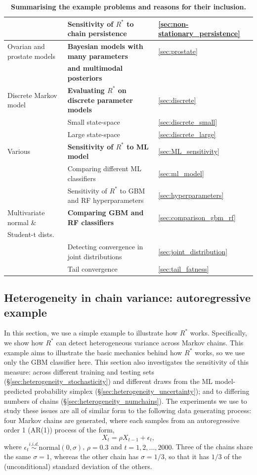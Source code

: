 \documentclass[ba]{imsart}
\numberwithin{equation}{section}
\theoremstyle{plain}
\begin{document}
\begin{table}[]
\begin{tabular}{l|l|l}
		& Sensitivity of $R^*$ to chain persistence & \ref{sec:non-stationary_persistence}\\
		\midrule
		Ovarian and prostate models & \textbf{Bayesian models with many parameters} & \ref{sec:prostate}\\
		&  \textbf{and multimodal posteriors} &\\
		\midrule		
		Discrete Markov model & \textbf{Evaluating $R^*$ on discrete parameter models} & \ref{sec:discrete}\\
		& Small state-space & \ref{sec:discrete_small}\\
		& Large state-space & \ref{sec:discrete_large}\\
		\midrule
		Various & \textbf{Sensitivity of $R^*$ to ML model} & \ref{sec:ML_sensitivity}\\
		& Comparing different ML classifiers & \ref{sec:ml_model}\\
		& Sensitivity of $R^*$ to GBM and RF hyperparameters & \ref{sec:hyperparameters}\\
		\midrule
		Multivariate normal \& & \textbf{Comparing GBM and RF classifiers} & \ref{sec:comparison_gbm_rf}\\
		Student-t dists. & &\\
		& Detecting convergence in joint distributions & \ref{sec:joint_distribution}\\
		& Tail convergence & \ref{sec:tail_fatness}\\
	\end{tabular}\caption{\textbf{Summarising the example problems and reasons for their inclusion.}}\label{tab:results}
\end{table}

\subsection{Heterogeneity in chain variance: autoregressive example}\label{sec:heterogeneity}
In this section, we use a simple example to illustrate how $R^*$ works. Specifically, we show how $R^*$ can detect heterogeneous variance across Markov chains. This example aims to illustrate the basic mechanics behind how $R^*$ works, so we use only the GBM classifier here. This section also investigates the sensitivity of this measure: across different training and testing sets (\S\ref{sec:heterogeneity_stochasticity}) and different draws from the ML model-predicted probability simplex (\S\ref{sec:heterogeneity_uncertainty}); and to differing numbers of chains (\S\ref{sec:heterogeneity_numchains}). The experiments we use to study these issues are all of similar form to the following data generating process: four Markov chains are generated, where each samples from an autoregressive order 1 (AR(1)) process of the form,
%
\begin{equation}\label{eq:ar1}
X_t = \rho X_{t-1} + \epsilon_t,
\end{equation}
%
where $\epsilon_t\stackrel{i.i.d.}{\sim}\text{normal}(0, \sigma)$, $\rho=0.3$ and $t=1,2,...,2000$. Three of the chains share the same $\sigma=1$, whereas the other chain has $\sigma=1/3$, so that it has $1/3$ of the (unconditional) standard deviation of the others.
\end{document}
